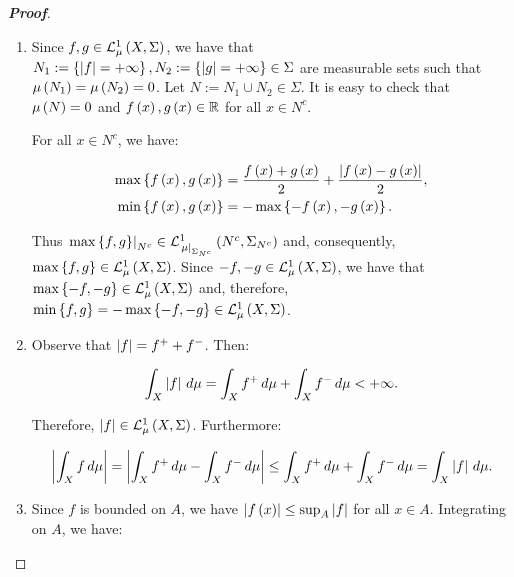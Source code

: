 \begin{proposition}
\begin{proof}[\rm\textbf{Proof}]
\begin{enumerate}
      \begin{equation}
        \begin{split}
          \int_{\bigcup_{n=1}^{\infty}{A_n}}{f\,d\mu} & =\int_{\bigcup_{n=1}^{\infty}{A_n}}{f^+\,d\mu}-\int_{\bigcup_{n=1}^{\infty}{A_n}}{f^-\,d\mu}\\
          & =\sum_{n=1}^{\infty}{\int_{A_n}{f^+\,d\mu}}-\sum_{n=1}^{\infty}{\int_{A_n}{f^-\,d\mu}}\\
          & =\sum_{n=1}^{\infty}{\pr{\int_{A_n}{f^+\,d\mu}-\int_{A_n}{f^-\,d\mu}}}=\sum_{n=1}^{\infty}{\int_{A_n}{f\,d\mu}}.
        \end{split}
      \end{equation}
      \item Since $f,g\in\Leb{X}{\Sigma}{\mu}$, we have that $N_1:=\set{\bars{f}=+\infty},N_2:=\set{\bars{g}=+\infty}\in\Sigma$ are measurable sets such that $\mu\pr{N_1}=\mu\pr{N_2}=0$. Let $N:=N_1\cup N_2\in\Sigma$. It is easy to check that $\mu\pr{N}=0$ and $f\pr{x},g\pr{x}\in\mathbb{R}$ for all $x\in N^c$. 
      
      For all $x\in N^c$, we have:
      
      \begin{equation}
        \begin{split}
          \max\set{f\pr{x},g\pr{x}} & =\frac{f\pr{x}+g\pr{x}}{2}+\frac{\bars{f\pr{x}-g\pr{x}}}{2},\\
          \min\set{f\pr{x},g\pr{x}} & =-\max\set{-f\pr{x},-g\pr{x}}.
        \end{split}
      \end{equation}

      Thus $\rest{\max\set{f,g}}{N^c}\in\Leb{N^c}{\Sigma_{N^c}}{\rest{\mu}{\Sigma_{N^c}}}$ and, consequently, $\max\set{f,g}\in\Leb{X}{\Sigma}{\mu}$. Since $-f,-g\in\Leb{X}{\Sigma}{\mu}$, we have that $\max\set{-f,-g}\in\Leb{X}{\Sigma}{\mu}$ and, therefore, $\min\set{f,g}=-\max\set{-f,-g}\in\Leb{X}{\Sigma}{\mu}$.
      \item Observe that $\bars{f}=f^++f^-$. Then:
      
      \begin{equation}
        \int_{X}{\bars{f}\,d\mu}=\int_{X}{f^+\,d\mu}+\int_{X}{f^-\,d\mu}<+\infty.
      \end{equation}

      Therefore, $\bars{f}\in\Leb{X}{\Sigma}{\mu}$. Furthermore:

      \begin{equation}
        \bars{\int_{X}{f\,d\mu}}=\bars{\int_{X}{f^+\,d\mu}-\int_{X}{f^-\,d\mu}}\leq\int_{X}{f^+\,d\mu}+\int_{X}{f^-\,d\mu}=\int_{X}{\bars{f}\,d\mu}.
      \end{equation}
      \item Since $f$ is bounded on $A$, we have $\bars{f\pr{x}}\leq\sup_A{\bars{f}}$ for all $x\in A$. Integrating on $A$, we have:
      

\end{enumerate}
\end{proof}
\end{proposition}

